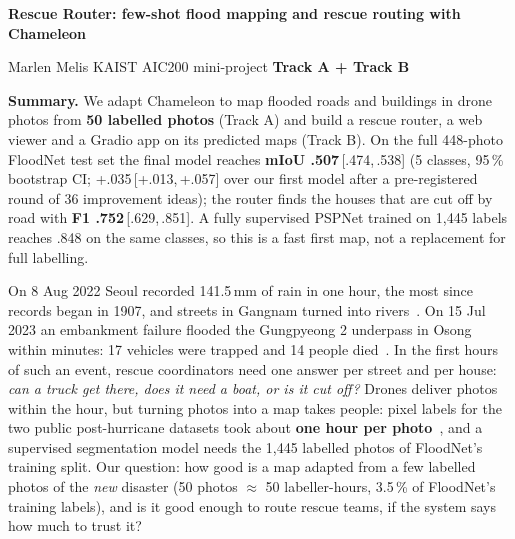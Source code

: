 \documentclass[10pt]{article}
\newcommand{\sect}[1]{\par\vspace{5pt}{\large\bfseries #1}\par\nobreak\vspace{1pt}\nobreak}
\newcommand{\ci}[2]{\,{\footnotesize[#1,\,#2]}}
\begin{document}
{\LARGE\bfseries Rescue Router: few-shot flood mapping and rescue routing with Chameleon}\par\vspace{2pt}
{\large Marlen Melis  \quad KAIST AIC200 mini-project \quad \textbf{Track A + Track B}}\par
\vspace{3pt}
\textbf{Summary.} We adapt Chameleon to map flooded roads and buildings in drone photos from \textbf{50 labelled photos}
(Track A) and build a rescue router, a web viewer and a Gradio app on its predicted maps (Track B). On the full
448-photo FloodNet test set the final model reaches \textbf{mIoU .507}\ci{.474}{.538} (5 classes, 95\,\% bootstrap CI;
+.035\ci{+.013}{+.057} over our first model after a pre-registered round of 36 improvement ideas); the router finds the
houses that are cut off by road with \textbf{F1 .752}\ci{.629}{.851}. A fully supervised PSPNet trained on 1,445 labels
reaches .848 on the same classes, so this is a fast first map, not a replacement for full labelling.

\sect{1\quad Problem and motivation}
On 8 Aug 2022 Seoul recorded 141.5\,mm of rain in one hour, the most since records began in 1907, and streets in
Gangnam turned into rivers~\cite{seoul}. On 15 Jul 2023 an embankment failure flooded the Gungpyeong 2 underpass in
Osong within minutes: 17 vehicles were trapped and 14 people died~\cite{osong}. In the first hours of such an event,
rescue coordinators need one answer per street and per house: \emph{can a truck get there, does it need a boat, or
is it cut off?} Drones deliver photos within the hour, but turning photos into a map takes people: pixel labels for
the two public post-hurricane datasets took about \textbf{one hour per photo}~\cite{floodnet,rescuenet}, and a
supervised segmentation model needs the 1,445 labelled photos of FloodNet's training split. Our question: how good is a
map adapted from a few labelled photos of the \emph{new} disaster (50 photos $\approx$ 50 labeller-hours, 3.5\,\% of
FloodNet's training labels), and is it good enough to route rescue teams, if the system says how much to trust it?
\end{document}
